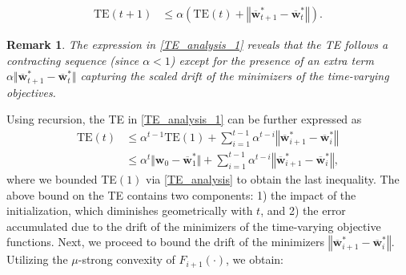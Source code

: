 \documentclass[conference]{IEEEtran}
\newcommand{\fraz}[1]{\textcolor{purple}{\bf [Fraz: #1]}}
\newcommand{\nm}[1]{\textcolor{magenta}{\bf [NM: #1]}}
\newtheorem{remark}{Remark}
\begin{document}
\begin{align}
\text{TE}(t+1)& \leq \alpha \left( \text{TE}(t)+\left\Vert \overline{\mathbf{w}}^*_{t+1} - \overline{\mathbf{w}}^*_{t} \right\Vert \right). \label{TE_analysis_1}
\end{align}
\begin{remark}
    The expression in \eqref{TE_analysis_1} reveals that the TE follows a contracting sequence (since $\alpha <1$) except for the presence of an extra term $\alpha \Vert \overline{\mathbf{w}}^*_{t+1} - \overline{\mathbf{w}}^*_{t} \Vert$ capturing the scaled drift of the minimizers of the time-varying objectives.
\end{remark}
Using recursion, the TE in \eqref{TE_analysis_1} can be further expressed as 
\begin{align}
     \text{TE}(t)&\leq \alpha^{t-1}\text{TE}(1) + \sum_{i=1}^{t-1}\alpha^{t-i} \left\Vert \overline{\mathbf{w}}^*_{i+1} - \overline{\mathbf{w}}^*_{i} \right\Vert\\
     &\leq
\alpha^{t}\Vert \mathbf{w}_{0} - \overline{\mathbf{w}}^*_{1}\Vert+ \sum_{i=1}^{t-1}\alpha^{t-i} \left\Vert \overline{\mathbf{w}}^*_{i+1} - \overline{\mathbf{w}}^*_{i} \right\Vert,\label{TE_recursive}
\end{align}
where we bounded TE$(1)$ via \eqref{TE_analysis} to obtain the last inequality. The above bound on the TE contains two components: 1) the impact of the initialization, which diminishes geometrically with $t$, and 2) the error accumulated due to the drift of the minimizers of the time-varying objective functions.
Next, we proceed to bound the drift of the minimizers $\left\Vert \overline{\mathbf{w}}^*_{i+1} - \overline{\mathbf{w}}^*_{i} \right\Vert$. Utilizing the $\mu$-strong convexity of $F_{i+1}(\cdot)$, we obtain:
\end{document}

